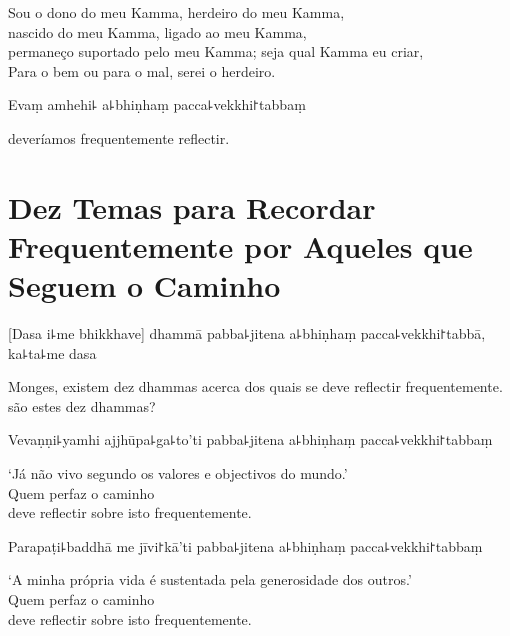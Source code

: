 \documentclass[
  babelLanguage=english,
  final,
  webversion,
]{chantingbook}
\begin{document}
\begin{english}
  Sou o dono do meu Kamma, herdeiro do meu Kamma,\\
  nascido do meu Kamma, ligado ao meu Kamma,\\
  permaneço suportado pelo meu Kamma; seja qual Kamma eu criar,\\
  Para o bem ou para o mal,  serei o herdeiro.
\end{english}

Evaṃ amhehi꜕ a꜕bhiṇhaṃ pacca꜕vekkhi꜓tabbaṃ

\begin{english}
   deveríamos frequentemente reflectir.
\end{english}

\chapter[Dez Temas]{Dez Temas para Recordar Frequentemente por Aqueles que Seguem o Caminho}


\enlargethispage{\baselineskip}

\begin{leader}
\end{leader}

[Dasa i꜕me bhikkhave] dhammā pabba꜕jitena a꜕bhiṇhaṃ pacca꜕vekkhi꜓tabbā, ka꜕ta꜕me dasa

\begin{english}
  Monges, existem dez dhammas acerca dos quais se deve reflectir frequentemente.  são estes dez dhammas?
\end{english}

Vevaṇṇi꜕yamhi ajjhūpa꜕ga꜕to'ti pabba꜕jitena a꜕bhiṇhaṃ pacca꜕vekkhi꜓tabbaṃ

\begin{english}
  `Já não vivo segundo os valores e objectivos do mundo.'\\
  Quem perfaz o caminho\\
  deve reflectir sobre isto frequentemente.
\end{english}

Parapaṭi꜕baddhā me jīvi꜓kā'ti pabba꜕jitena a꜕bhiṇhaṃ pacca꜕vekkhi꜓tabbaṃ

\begin{english}
  `A minha própria vida é sustentada pela generosidade dos outros.'\\
  Quem perfaz o caminho\\
  deve reflectir sobre isto frequentemente.
\end{english}
\end{document}

